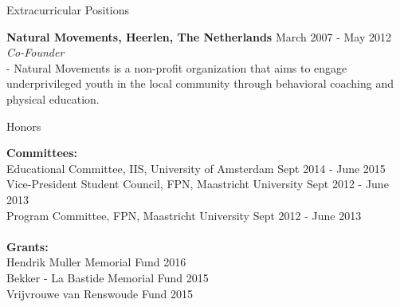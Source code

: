 \documentclass{resume}
\begin{document}
\begin{sections}{Extracurricular Positions}

{\bf Natural Movements, Heerlen, The Netherlands} \hfill {March 2007 - May 2012}
\\{\textit{Co-Founder}}
\\- Natural Movements is a non-profit organization that aims to engage underprivileged youth in the local community through behavioral coaching and physical education.

\end{sections}

\begin{sections}{Honors}

{\bf Committees:}
\\
{Educational Committee, IIS, University of Amsterdam} \hfill {Sept 2014 - June 2015}
\\
{Vice-President Student Council, FPN, Maastricht University} \hfill {Sept 2012 - June 2013}
\\
{Program Committee, FPN, Maastricht University} \hfill {Sept 2012 - June 2013}
\\
\\
{\bf Grants:}
\\
{Hendrik Muller Memorial Fund} \hfill {2016}
\\
{Bekker - La Bastide Memorial Fund} \hfill {2015}
\\
{Vrijvrouwe van Renswoude Fund} \hfill {2015}

\end{sections}
\end{document}
